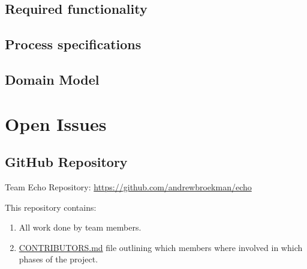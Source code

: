 \documentclass[a4paper,10pt]{article}
\begin{document}
\subsection{Required functionality}

	

\subsection{Process specifications}

\subsection{Domain Model}

\section{Open Issues}
\subsection {GitHub Repository}
Team Echo Repository: \url{https://github.com/andrewbroekman/echo}

This repository contains:
\begin{enumerate}
\item All work done by team members.
\item \href{https://github.com/andrewbroekman/echo/blob/master/CONTRIBUTORS.md}{CONTRIBUTORS.md} file outlining which members where involved in which phases of the project.
\end{enumerate}
\end{document}
